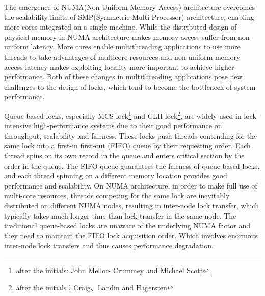 \begin{englishabstract}
The emergence of NUMA(Non-Uniform Memory Access) architecture overcomes the scalability limits of SMP(Symmetric Multi-Processor) architecture, enabling more cores integrated on a single machine. While the distributed design of physical memory in NUMA architecture makes memory access suffer from non-uniform latency. More cores enable multithreading applications to use more threads to take advantages of multicore resources and non-uniform memory access latency makes exploiting locality more important to achieve higher performance. Both of these changes in multithreading applications pose new challenges to the design of locks, which tend to become the bottleneck of system performance.

Queue-based locks, especially MCS lock\footnote{after the initials: John Mellor-
Crummey and Michael Scott} and CLH lock\footnote{after the initials：Craig、Landin and Hagersten}, are widely used in lock-intensive high-performance systems due to their good performance on throughput, scalability and fairness. These locks push threads contending for the same lock into a first-in first-out (FIFO) queue by their requesting order. Each thread spins on its own record in the queue and enters critical section by the order in the queue. The FIFO queue guarantees the fairness of queue-based locks, and each thread spinning on a different memory location provides good performance and scalability. On NUMA architecture, in order to make full use of multi-core resources, threads competing for the same lock are inevitably distributed on different NUMA nodes, resulting in inter-node lock transfer, which typically takes much longer time than lock transfer in the same node. The traditional queue-based locks are unaware of  the underlying NUMA factor and they need to maintain the FIFO lock acquisition order. Which involves enormous inter-node lock transfers and thus causes performance degradation.



\end{englishabstract}
